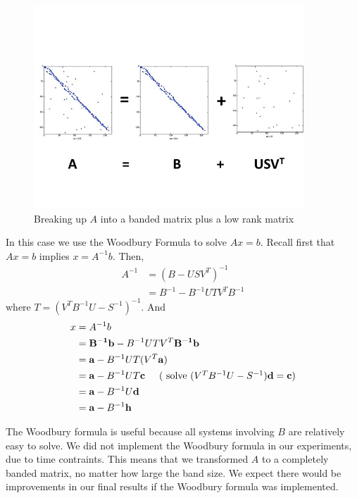 \documentclass[a4paper,12pt]{article}
\begin{document}
\begin{figure}[htbp] %
   \centering
   \includegraphics[trim = 5mm 30mm 0mm 40mm, clip, width=4in]{Images/Slide1.jpg}
    \caption{Breaking up $A$ into a banded matrix plus a low rank matrix}
    \label{fig:woodbury}
\end{figure}

In this case we use the Woodbury Formula to solve $Ax = b$. Recall first that $ Ax = b$  implies $x = A^{-1} b$. Then,
\begin{align*}
A^{-1} &= (B - USV^T)^{-1}\\
	  &= B^{-1} - B^{-1}UTV^TB^{-1}
\end{align*}
where $T = (V^TB^{-1}U - S^{-1})^{-1}$. And 
\begin{align*}
x &= A^{-1}b\\
  &= {\bf B^{-1} b} - B^{-1}UTV^T {\bf B^{-1} b} \\
   &= {\bf a} - B^{-1}UT(V^T {\bf a}) \\
   &= {\bf a} - B^{-1}UT {\bf c}  \hspace{.5cm} \mbox{( solve ($V^TB^{-1}U-S^{-1}) \textbf{d} = \textbf{c}$)}\\
   &= {\bf a} - B^{-1}U\textbf{d}\\
   &= {\bf a} - B^{-1}\textbf{h}
\end{align*}

The Woodbury formula is useful because all systems involving $B$ are relatively easy to solve. We did not implement the Woodbury formula in our experiments, due to time contraints. This means that we transformed $A$ to a completely banded matrix, no matter how large the band size. We expect there would be improvements in our final results if the Woodbury formula was implemented.
\end{document}
